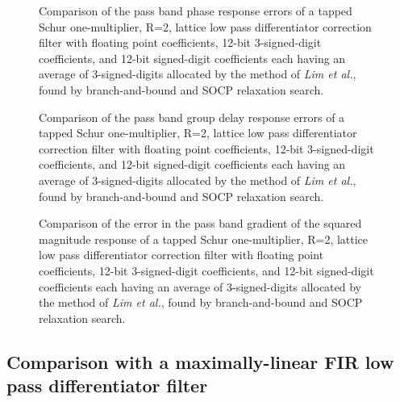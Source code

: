 \documentclass[a4paper,twoside,10pt,english]{article}
\newcommand{\DesignOfSchurLatticeFiltersPdfScale}{1}
\begin{document}
\begin{figure}
\centering
\scalebox{\DesignOfSchurLatticeFiltersPdfScale}{}
\caption{Comparison of the pass band phase response errors of a tapped Schur
  one-multiplier, R=2, lattice low pass differentiator correction filter with
  floating point coefficients, 12-bit 3-signed-digit coefficients, and 12-bit
  signed-digit coefficients each having an average of 3-signed-digits allocated
  by the method of \emph{Lim et al.}, found by branch-and-bound and
  SOCP relaxation search.}
\label{fig:Comp-schurOneMlattice-lowpass-diff-R2-12-nbits-phase}
\end{figure}

\begin{figure}
\centering
\scalebox{\DesignOfSchurLatticeFiltersPdfScale}{}
\caption{Comparison of the pass band group delay response errors of a tapped
  Schur one-multiplier, R=2, lattice low pass differentiator correction filter
  with floating point coefficients, 12-bit 3-signed-digit coefficients, and
  12-bit signed-digit coefficients each having an average of 3-signed-digits
  allocated by the method of \emph{Lim et al.}, found by branch-and-bound and
  SOCP relaxation search.}
\label{fig:Comp-schurOneMlattice-lowpass-diff-R2-12-nbits-delay}
\end{figure}

\begin{figure}
\centering
\scalebox{\DesignOfSchurLatticeFiltersPdfScale}{}
\caption{Comparison of the error in the pass band gradient of the squared
  magnitude response of a tapped Schur one-multiplier, R=2, lattice low pass
  differentiator correction filter with floating point coefficients, 12-bit
  3-signed-digit coefficients, and 12-bit signed-digit coefficients each having
  an average of 3-signed-digits allocated by the method of \emph{Lim et al.},
  found by branch-and-bound and SOCP relaxation search.}
\label{fig:Comp-schurOneMlattice-lowpass-diff-R2-12-nbits-dCsqdw}
\end{figure}

\subsection{Comparison with a maximally-linear  FIR low pass differentiator filter}
\end{document}
